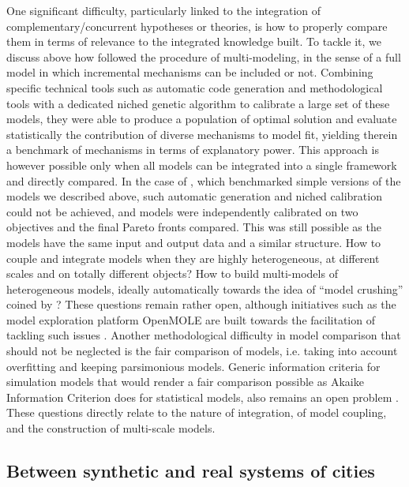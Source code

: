 \documentclass[10pt,letterpaper]{article}
\begin{document}
One significant difficulty, particularly linked to the integration of complementary/concurrent hypotheses or theories, is how to properly compare them in terms of relevance to the integrated knowledge built. To tackle it, we discuss above how \cite{cottineau2015modular} followed the procedure of multi-modeling, in the sense of a full model in which incremental mechanisms can be included or not. Combining specific technical tools such as automatic code generation and methodological tools with a dedicated niched genetic algorithm to calibrate a large set of these models, they were able to produce a population of optimal solution and evaluate statistically the contribution of diverse mechanisms to model fit, yielding therein a benchmark of mechanisms in terms of explanatory power. This approach is however possible only when all models can be integrated into a single framework and directly compared. In the case of \citep{raimbault2020empowering}, which benchmarked simple versions of the models we described above, such automatic generation and niched calibration could not be achieved, and models were independently calibrated on two objectives and the final Pareto fronts compared. This was still possible as the models have the same input and output data and a similar structure. How to couple and integrate models when they are highly heterogeneous, at different scales and on totally different objects? How to build multi-models of heterogeneous models, ideally automatically towards the idea of ``model crushing'' coined by \citep{openshaw1993modelling}? These questions remain rather open, although initiatives such as the model exploration platform OpenMOLE are built towards the facilitation of tackling such issues \citep{raimbault2019methods}. Another methodological difficulty in model comparison that should not be neglected is the fair comparison of models, i.e. taking into account overfitting and keeping parsimonious models. Generic information criteria for simulation models that would render a fair comparison possible as Akaike Information Criterion does for statistical models, also remains an open problem \citep{raimbault2020indirect}. These questions directly relate to the nature of integration, of model coupling, and the construction of multi-scale models.


\subsection{Between synthetic and real systems of cities}
\end{document}
